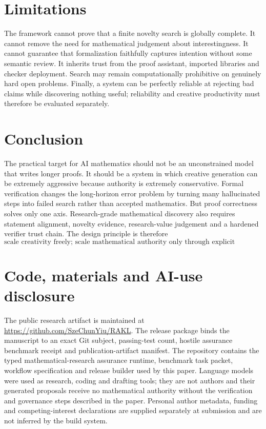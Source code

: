 \documentclass[11pt]{article}
\begin{document}
\section{Limitations}

The framework cannot prove that a finite novelty search is globally complete. It cannot remove the need for mathematical judgement about interestingness. It cannot guarantee that formalization faithfully captures intention without some semantic review. It inherits trust from the proof assistant, imported libraries and checker deployment. Search may remain computationally prohibitive on genuinely hard open problems. Finally, a system can be perfectly reliable at rejecting bad claims while discovering nothing useful; reliability and creative productivity must therefore be evaluated separately.

\section{Conclusion}

The practical target for AI mathematics should not be an unconstrained model that writes longer proofs. It should be a system in which creative generation can be extremely aggressive because authority is extremely conservative. Formal verification changes the long-horizon error problem by turning many hallucinated steps into failed search rather than accepted mathematics. But proof correctness solves only one axis. Research-grade mathematical discovery also requires statement alignment, novelty evidence, research-value judgement and a hardened verifier trust chain. The design principle is therefore
\[
\boxed{\text{scale creativity freely; scale mathematical authority only through explicit assurance.}}
\]

\section*{Code, materials and AI-use disclosure}
The public research artifact is maintained at \url{https://github.com/SzeChunYiu/RAKL}. The release package binds the manuscript to an exact Git subject, passing-test count, hostile assurance benchmark receipt and publication-artifact manifest. The repository contains the typed mathematical-research assurance runtime, benchmark task packet, workflow specification and release builder used by this paper. Language models were used as research, coding and drafting tools; they are not authors and their generated proposals receive no mathematical authority without the verification and governance steps described in the paper. Personal author metadata, funding and competing-interest declarations are supplied separately at submission and are not inferred by the build system.
\end{document}
